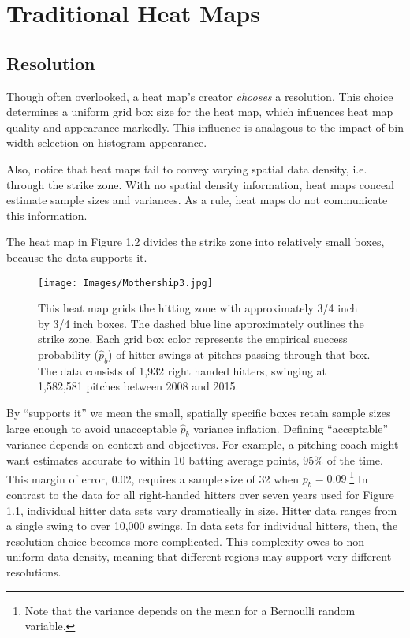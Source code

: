 \section{Traditional Heat Maps}

\subsection{Resolution} %

Though often overlooked, a heat map's creator {\it chooses} a resolution. This choice determines a uniform grid box size for the heat map, which influences heat map quality and appearance markedly. This influence is analagous to the impact of bin width selection on histogram appearance. 

Also, notice that heat maps fail to convey varying spatial data density, i.e. through the strike zone. With no spatial density information, heat maps conceal estimate sample sizes and variances.  As a rule, heat maps do not communicate this information.

The heat map in Figure 1.2 divides the strike zone into relatively small boxes, because the data supports it.
  \begin{figure}[H]
	\centering
	\texttt{[image: Images/Mothership3.jpg]} 
  \caption{This heat map grids the hitting zone with approximately 3/4 inch by 3/4 inch boxes. The dashed blue line approximately outlines the strike zone. Each grid box color represents the empirical success probability ($\hat{p}_{b}$) of hitter swings at pitches passing through that box.  The data consists of 1,932 right handed hitters, swinging at 1,582,581 pitches between 2008 and 2015.}
	\end{figure} 
By ``supports it'' we mean the small, spatially specific boxes retain sample sizes large enough to avoid unacceptable $\hat{p}_{b}$ variance inflation. Defining ``acceptable'' variance depends on context and objectives. For example, a pitching coach might want estimates accurate to within 10 batting average points, 95\% of the time. This margin of error, 0.02, requires a sample size of 32 when $p_{b} = 0.09$.\footnote{Note that the variance depends on the mean for a Bernoulli random variable.} In contrast to the data for all right-handed hitters over seven years used for Figure 1.1, individual hitter data sets vary dramatically in size. Hitter data ranges from a single swing to over 10,000 swings. In data sets for individual hitters, then, the resolution choice becomes more complicated. This complexity owes to non-uniform data density, meaning that different regions may support very different resolutions. 

